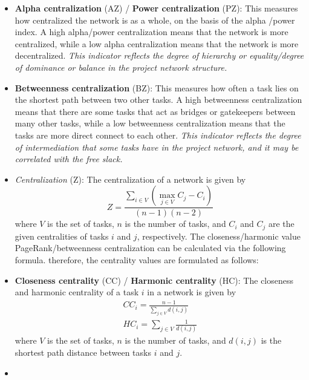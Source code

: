\documentclass[preprint,
3p]{elsarticle} %
\begin{document}
\begin{appendices}
\begin{itemize}
  which have more impact on other tasks, while a low PageRank
  centralization means that the tasks are more equally impacted.
  \emph{This indicator reflects the degree of impact that some tasks
  have on the project network.}
\item
  \textbf{Alpha centralization} (AZ) / \textbf{Power centralization}
  (PZ): This measures how centralized the network is as a whole, on the
  basis of the alpha /power index. A high alpha/power centralization
  means that the network is more centralized, while a low alpha
  centralization means that the network is more decentralized.
  \emph{This indicator reflects the degree of hierarchy or
  equality/degree of dominance or balance in the project network
  structure.}
\item
  \textbf{Betweenness centralization} (BZ): This measures how often a
  task lies on the shortest path between two other tasks. A high
  betweenness centralization means that there are some tasks that act as
  bridges or gatekeepers between many other tasks, while a low
  betweenness centralization means that the tasks are more direct
  connect to each other. \emph{This indicator reflects the degree of
  intermediation that some tasks have in the project network, and it may
  be correlated with the free slack.}
\item
  \emph{Centralization} (Z): The centralization of a network is given by
  \begin{equation}
  Z = \frac {\sum_{i \in V} (\max_{j \in V} C_j - C_i)} {(n-1)(n-2)} \label{eq:Z}
  \end{equation} \noindent where \(V\) is the set of tasks, \(n\) is the
  number of tasks, and \(C_i\) and \(C_j\) are the given centralities of
  tasks \(i\) and \(j\), respectively. The closeness/harmonic value
  PageRank/betweenness centralization can be calculated via the
  following formula. therefore, the centrality values are formulated as
  follows:
\item
  \textbf{Closeness centrality} (CC) / \textbf{Harmonic centrality}
  (HC): The closeness and harmonic centrality of a task \(i\) in a
  network is given by \begin{eqnarray}
  CC_i = \frac {n-1} {\sum_{j \in V} d(i,j)} \label{eq:cC} \\
  HC_i = \sum_{j \in V} \frac {1} {d(i,j)}
  \end{eqnarray} \noindent where \(V\) is the set of tasks, \(n\) is the
  number of tasks, and \(d(i,j)\) is the shortest path distance between
  tasks \(i\) and \(j\).
\item

\end{itemize}
\end{appendices}
\end{document}
